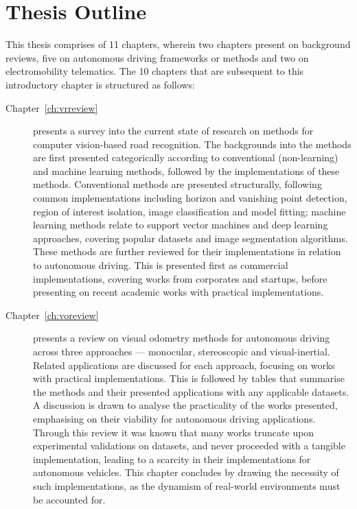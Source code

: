 
\section{Thesis Outline}
This thesis comprises of 11 chapters, wherein two chapters present on background reviews, five on autonomous driving frameworks or methods and two on electromobility telematics. The 10 chapters that are subsequent to this introductory chapter is structured as follows: 
\begin{description}
	\item[Chapter~\ref{ch:vrreview}] presents a survey into the current state of research on methods for computer vision-based road recognition. The backgrounds into the methods are first presented categorically according to conventional (non-learning) and machine learning methods, followed by the implementations of these methods. Conventional methods are presented structurally, following common implementations including horizon and vanishing point detection, region of interest isolation, image classification and model fitting; machine learning methods relate to support vector machines and deep learning approaches, covering popular datasets and image segmentation algorithms. These methods are further reviewed for their implementations in relation to autonomous driving. This is presented first as commercial implementations, covering works from corporates and startups, before presenting on recent academic works with practical implementations. 
	\item[Chapter~\ref{ch:voreview}] presents a review on visual odometry methods for autonomous driving across three approaches --- monocular, stereoscopic and visual-inertial. Related applications are discussed for each approach, focusing on works with practical implementations. This is followed by tables that summarise the methods and their presented applications with any applicable datasets. A discussion is drawn to analyse the practicality of the works presented, emphasising on their viability for autonomous driving applications. Through this review it was known that many works truncate upon experimental validations on datasets, and never proceeded with a tangible implementation, leading to a scarcity in their implementations for autonomous vehicles. This chapter concludes by drawing the necessity of such implementations, as the dynamism of real-world environments must be accounted for.

\end{description}
